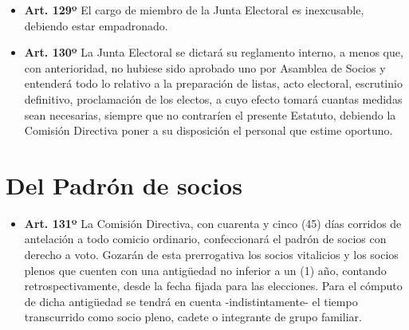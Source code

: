\documentclass[openany]{book}
\providecommand{\tightlist}{%
  \setlength{\itemsep}{0pt}\setlength{\parskip}{0pt}}
\begin{document}
\begin{itemize}
\tightlist
\item
  \textbf{Art. 129º}
  El cargo de miembro de la Junta Electoral es inexcusable, debiendo estar empadronado.
\end{itemize}

\begin{itemize}
\tightlist
\item
  \textbf{Art. 130º}
  La Junta Electoral se dictará su reglamento interno, a menos que, con anterioridad, no hubiese sido aprobado uno por Asamblea de Socios y entenderá todo lo relativo a la preparación de listas, acto electoral, escrutinio definitivo, proclamación de los electos, a cuyo efecto tomará cuantas medidas sean necesarias, siempre que no contraríen el presente Estatuto, debiendo la Comisión Directiva poner a su disposición el personal que estime oportuno.
\end{itemize}

\hypertarget{del-padron-de-socios}{%
\section{Del Padrón de socios}\label{del-padron-de-socios}}

\begin{itemize}
\tightlist
\item
  \textbf{Art. 131º}
  La Comisión Directiva, con cuarenta y cinco (45) días corridos de antelación a todo comicio ordinario, confeccionará el padrón de socios con derecho a voto. Gozarán de esta prerrogativa los socios vitalicios y los socios plenos que cuenten con una antigüedad no inferior a un (1) año, contando retrospectivamente, desde la fecha fijada para las elecciones. Para el cómputo de dicha antigüedad se tendrá en cuenta -indistintamente- el tiempo transcurrido como socio pleno, cadete o integrante de grupo familiar.
\end{itemize}
\end{document}

